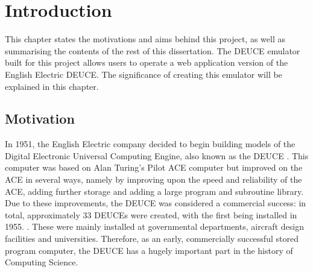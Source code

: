\documentclass{l4proj}
\begin{document}
%
%
%
%
%
%
%
\chapter{Introduction}

This chapter states the motivations and aims behind this project, as well as summarising the
contents of the rest of this dissertation. The DEUCE emulator built for this project allows
users to operate a web application version of the English Electric DEUCE. The significance of creating
this emulator will be explained in this chapter.

\section{Motivation}

In 1951, the English Electric company decided to begin building models of the Digital Electronic Universal Computing Engine, also known as the DEUCE \citep{Vowels05}. This computer was based on Alan Turing's Pilot ACE computer but improved on the ACE in several ways, namely by improving upon the speed and reliability of the ACE, adding further storage and adding a large program and subroutine library. Due to these improvements, the DEUCE was considered a commercial success: in total, approximately 33 DEUCEs were created, with the first being installed in 1955. \citep{Vowels05}. These were mainly installed at governmental departments, aircraft design facilities and universities. Therefore, as an early, commercially successful stored program computer, the DEUCE has a hugely important part in the history of Computing Science.
\end{document}

